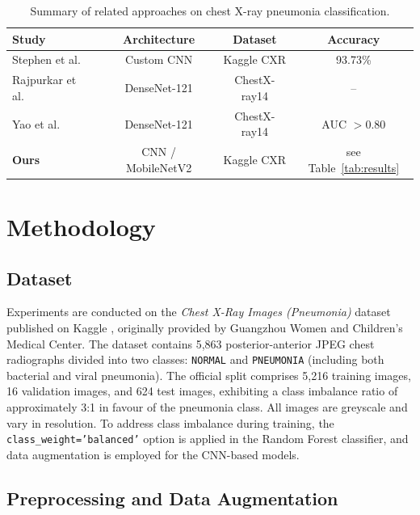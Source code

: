 \documentclass[conference]{IEEEtran}
\begin{document}
\begin{table}[h]
\centering
\caption{Summary of related approaches on chest X-ray
         pneumonia classification.}
\label{tab:related}
\begin{tabular}{lccc}
\toprule
\textbf{Study} & \textbf{Architecture} & \textbf{Dataset} &
\textbf{Accuracy} \\
\midrule
Stephen et al.\ \cite{stephen2019} & Custom CNN       & Kaggle CXR & 93.73\% \\
Rajpurkar et al.\ \cite{rajpurkar2017} & DenseNet-121 & ChestX-ray14 & -- \\
Yao et al.\ \cite{yao2018}            & DenseNet-121 & ChestX-ray14 & AUC $>$0.80 \\
\textbf{Ours}                        & CNN / MobileNetV2 & Kaggle CXR & see Table~\ref{tab:results} \\
\bottomrule
\end{tabular}
\end{table}

\section{Methodology}
\label{sec:methodology}

\subsection{Dataset}

Experiments are conducted on the \emph{Chest X-Ray Images
(Pneumonia)} dataset published on Kaggle \cite{kaggle2018},
originally provided by Guangzhou Women and Children's Medical
Center. The dataset contains 5,863 posterior-anterior JPEG
chest radiographs divided into two classes: \texttt{NORMAL} and
\texttt{PNEUMONIA} (including both bacterial and viral
pneumonia). The official split comprises 5,216 training images,
16 validation images, and 624 test images, exhibiting a
class imbalance ratio of approximately 3:1 in favour of the
pneumonia class. All images are greyscale and vary in
resolution. To address class imbalance during training, the
\texttt{class\_weight='balanced'} option is applied in the
Random Forest classifier, and data augmentation is employed
for the CNN-based models.

\subsection{Preprocessing and Data Augmentation}
\end{document}
